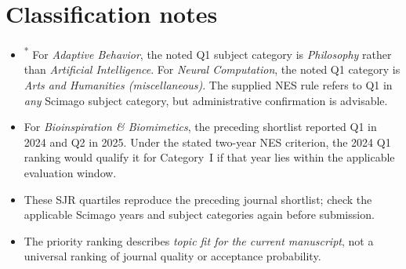 \documentclass[a4paper,11pt]{article}
\begin{document}
\section*{Classification notes}
\begin{itemize}
  \item \textsuperscript{*} For \emph{Adaptive Behavior}, the noted Q1 subject category
  is \emph{Philosophy} rather than \emph{Artificial Intelligence}. For
  \emph{Neural Computation}, the noted Q1 category is
  \emph{Arts and Humanities (miscellaneous)}. The supplied NES rule refers
  to Q1 in \emph{any} Scimago subject category, but administrative
  confirmation is advisable.
  \item For \emph{Bioinspiration \& Biomimetics}, the preceding shortlist reported
  Q1 in 2024 and Q2 in 2025. Under the stated two-year NES criterion, the
  2024 Q1 ranking would qualify it for Category~I if that year lies within
  the applicable evaluation window.
  \item These SJR quartiles reproduce the preceding journal shortlist;
  check the applicable Scimago years and subject categories again before submission.
  \item The priority ranking describes \emph{topic fit for the current manuscript},
  not a universal ranking of journal quality or acceptance probability.
\end{itemize}
\end{document}
